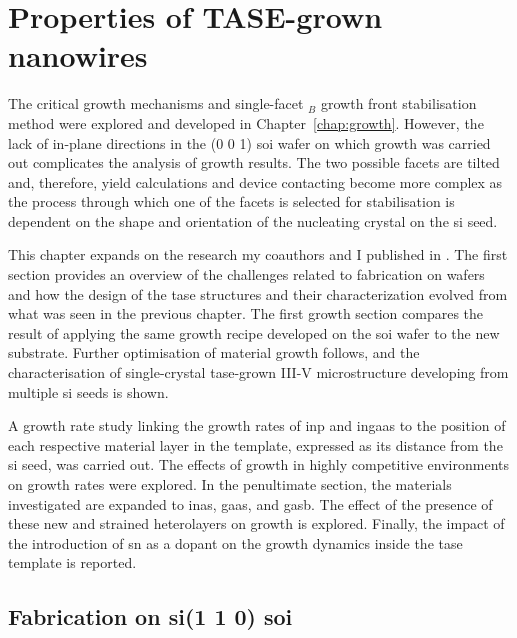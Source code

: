 \chapter{Properties of TASE-grown nanowires}
\label{chap:properties}

The critical growth mechanisms and single-facet \(_B\) growth front stabilisation method were explored and developed in Chapter~\ref{chap:growth}. However, the lack of in-plane  directions in the \hkl(0 0 1) \acf{soi} wafer on which growth was carried out complicates the analysis of growth results. The two possible  facets are tilted and, therefore, yield calculations and device contacting become more complex as the process through which one of the facets is selected for stabilisation is dependent on the shape and orientation of the nucleating crystal on the \acs{si} seed.

This chapter expands on the research my coauthors and I published in \cite{Brugnolotto2023, Brugnolotto2023_2}. The first section provides an overview of the challenges related to fabrication on  wafers and how the design of the \acf{tase} structures and their characterization evolved from what was seen in the previous chapter. The first growth section compares the result of applying the same growth recipe developed on the  \acs{soi} wafer to the new substrate. Further optimisation of material growth follows, and the characterisation of single-crystal \acs{tase}-grown III-V microstructure developing from multiple \acl{si} seeds is shown.

A growth rate study linking the growth rates of \acf{inp} and \acf{ingaas} to the position of each respective material layer in the template, expressed as its distance from the \acl{si} seed, was carried out. The effects of growth in highly competitive environments on growth rates were explored. In the penultimate section, the materials investigated are expanded to \acf{inas}, \acf{gaas}, and \acf{gasb}. The effect of the presence of these new and strained heterolayers on growth is explored. Finally, the impact of the introduction of \acf{sn} as a dopant on the growth dynamics inside the \acs{tase} template is reported.

\section{\texorpdfstring{Fabrication on \acs{si}\hkl(1 1 0) \acs{soi}}{Fabrication on Si(110) SOI}}

